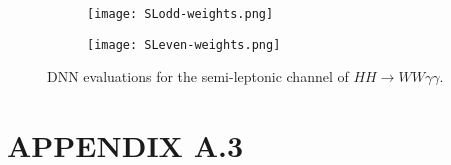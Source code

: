 \begin{figure*}[h!]
    \centering
    \begin{subfigure}[b]{0.475\textwidth}
        \centering
        \texttt{[image: SLodd-weights.png]}
        \vspace{-0.5cm}
    \end{subfigure}
    \hfill
    \begin{subfigure}[b]{0.475\textwidth}  
        \centering 
        \texttt{[image: SLeven-weights.png]}
        \vspace{-0.5cm}
    \end{subfigure}
    \caption{\small DNN evaluations for the semi-leptonic channel of $HH\rightarrow{WW\gamma\gamma}$.} 
\end{figure*}


\section*{APPENDIX A.3}

